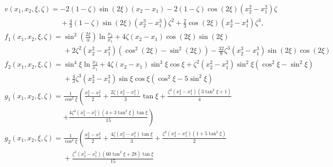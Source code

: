 \documentclass[12pt]{article}
\begin{document}
\begin{subequations}
\begin{align}
&v(x_1,x_2,\xi,\zeta)= -2(1-\zeta)\sin(2\xi)(x_2-x_1)-2(1-\zeta)\cos(2\xi)(x_2^2-x_1^2)\zeta\nonumber\\
&\phantom{v(x_1,x_2,\xi,\zeta)= }+\frac{4}{3}(1-\zeta)\sin(2\xi)(x_2^3-x_1^3)\zeta^2+\frac{2}{3}\cos(2\xi)(x_2^4-x_1^4)\zeta^3,\\
&f_1(x_1,x_2,\xi,\zeta)=\sin^2\left(\frac{2\xi}{\alpha}\right)\ln\frac{x_2}{x_1}+4\zeta(x_2-x_1)\cos(2\xi)\sin(2\xi)\nonumber\\
&\phantom{f_1(x_1,x_2,\xi,\zeta)=}+2\zeta^2(x_2^2-x_1^2)\left(\cos^2(2\xi)-\sin^2(2\xi)\right)-\frac{32}{9}\zeta^3(x_2^3-x_1^3)\sin(2\xi)\cos(2\xi)\\
&f_2(x_1,x_2,\xi,\zeta)=\sin^4\xi\ln\frac{x_2}{x_1}+4\zeta(x_2-x_1)\sin^3\xi\cos\xi+\zeta^2(x_2^2-x_1^2)\sin^2\xi(\cos^2\xi-\sin^2\xi)\nonumber\\
&\phantom{f_2(x_1,x_2,\xi,\zeta)=}+\frac{4}{3}\zeta^3(x_2^3-x_1^3)\sin\xi\cos\xi\left(\cos^2\xi-5\sin^2\xi\right)\\
&g_1(x_1,x_2,\xi,\zeta)=\frac{1}{\cos^2\xi}\left(\frac{x_2^2-x_1^2}{2}+\frac{2\zeta(x_2^3-x_1^2)}{3}\tan\xi+\frac{\zeta^2(x_2^4-x_1^4)(3\tan^2\xi+1)}{4}\right.\nonumber\\
&\phantom{g_1(x_1,x_2,\xi,\zeta)=}\left.+\frac{4\zeta^3(x_2^5-x_1^5)(4+3\tan^2\xi)\tan\xi}{15}\right)\\
&g_2(x_1,x_2,\xi,\zeta)=\frac{1}{\cos^4\xi}\left(\frac{x_2^2-x_1^2}{2}+\frac{4\zeta(x_2^3-x_1^3)\tan\xi}{3}+\frac{\zeta^2(x_2^4-x_1^4)(1+5\tan^2\xi)}{2}\right.\nonumber\\
&\phantom{g_2(x_1,x_2,\xi,\zeta)=}+\frac{\zeta^3(x_2^5-x_1^5)(60\tan^2\xi+28)\tan\xi}{15}
\end{align}
\end{subequations}

\clearpage


\end{document}
